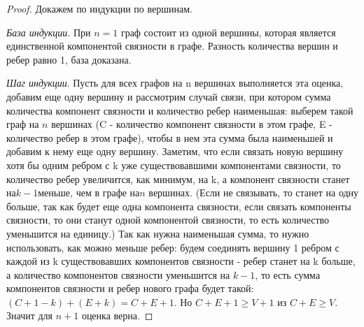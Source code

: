 \documentclass[a4paper,12pt]{article}
\begin{document}
	\begin{proof}
		Докажем по индукции по вершинам. 
		
		\textit{База индукции}. При $n = 1$ граф состоит из одной вершины, которая является единственной компонентой связности в графе. Разность количества вершин и ребер равно 1, база доказана.
		
		\textit{Шаг индукции}. Пусть для всех графов на n вершинах выполняется эта оценка, добавим еще одну вершину и рассмотрим случай связи, при котором сумма количества компонент
		связности и количество ребер наименьшая: выберем такой граф на $n$ вершинах (C - количество
		компонент связности в этом графе, E - количество ребер в этом графе), чтобы в нем эта сумма
		была наименьшей и добавим к нему еще одну вершину. Заметим, что если связать новую вершину
		хотя бы одним ребром с k уже существовавшими компонентами связности, то количество ребер
		увеличится, как минимум, на k, а компонент связности станет на$ k - 1 $меньше, чем в графе на$ n$
		вершинах. (Если не связывать, то станет на одну больше, так как будет еще одна компонента
		связности, если связать компоненты связности, то они станут одной компонентой связности, то
		есть количество уменьшится на единицу.) Так как нужна наименьшая сумма, то нужно
		использовать, как можно меньше ребер: будем соединять вершину 1 ребром с каждой из k существовавших компонентов связности - ребер станет на k больше, а количество компонентов
		связности уменьшится на $k - 1$, то есть сумма компонентов связности и ребер нового графа будет
		такой: $(C + 1 - k) + (E + k) = C + E + 1$. Но $ C + E + 1 \geq V + 1 $ из $ C + E \geq V$. Значит для $n + 1$ 		оценка верна.
	\end{proof}

	
\end{document}
